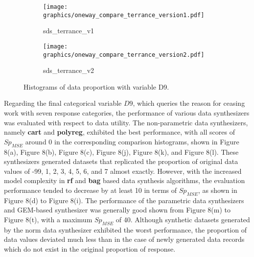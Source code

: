 \newpage
\begin{figure}[H]\ContinuedFloat
\begin{center}
    \begin{subfigure}{0.32\textwidth}
        \centering
        \texttt{[image: graphics/oneway\_compare\_terrance\_version1.pdf]}  
        \caption{sds\_terrance\_v1}
        \label{subfig:terrancev1D9}
    \end{subfigure}
    \begin{subfigure}{0.32\textwidth}
        \centering
        \texttt{[image: graphics/oneway\_compare\_terrance\_version2.pdf]}  
        \caption{sds\_terrance\_v2}
        \label{subfig:terrancev2D9}
    \end{subfigure}
\end{center}
    \caption[]{Histograms of data proportion with variable D9.}
    \label{fig:D9-3}
\end{figure}

Regarding the final categorical variable $D9$, which queries the reason for ceasing work with seven response categories, the performance of various data synthesizers was evaluated with respect to data utility. The non-parametric data synthesizers, namely \textbf{cart} and \textbf{polyreg}, exhibited the best performance, with all scores of $Sp_{MSE}$ around 0 in the corresponding comparison histograms, shown in Figure 8(a), Figure 8(b), Figure 8(c), Figure 8(j), Figure 8(k), and Figure 8(l). These synthesizers generated datasets that replicated the proportion of original data values of -99, 1, 2, 3, 4, 5, 6, and 7 almost exactly. However, with the increased model complexity in \textbf{rf} and \textbf{bag} based data synthesis algorithms, the evaluation performance tended to decrease by at least 10 in terms of $Sp_{MSE}$, as shown in Figure 8(d) to Figure 8(i). The performance of the parametric data synthesizers and GEM-based synthesizer was generally good shown from Figure 8(m) to Figure 8(t), with a maximum $Sp_{MSE}$ of 40. Although synthetic datasets generated by the norm data synthesizer exhibited the worst performance, the proportion of data values deviated much less than in the case of newly generated data records which do not exist in the original proportion of response.

